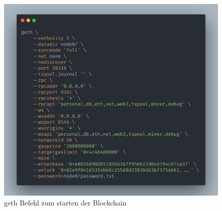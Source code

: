 \begin{figure}[hbt!]
	\centering
	\includegraphics[trim=0 0 0 0.503\imageheight{}, clip, width=.9\columnwidth]{./Abbildungen/Kapitel_03/geth.png}
	\caption{geth Befehl zum starten der Blockchain}
	\label{img:geth}
\end{figure}

